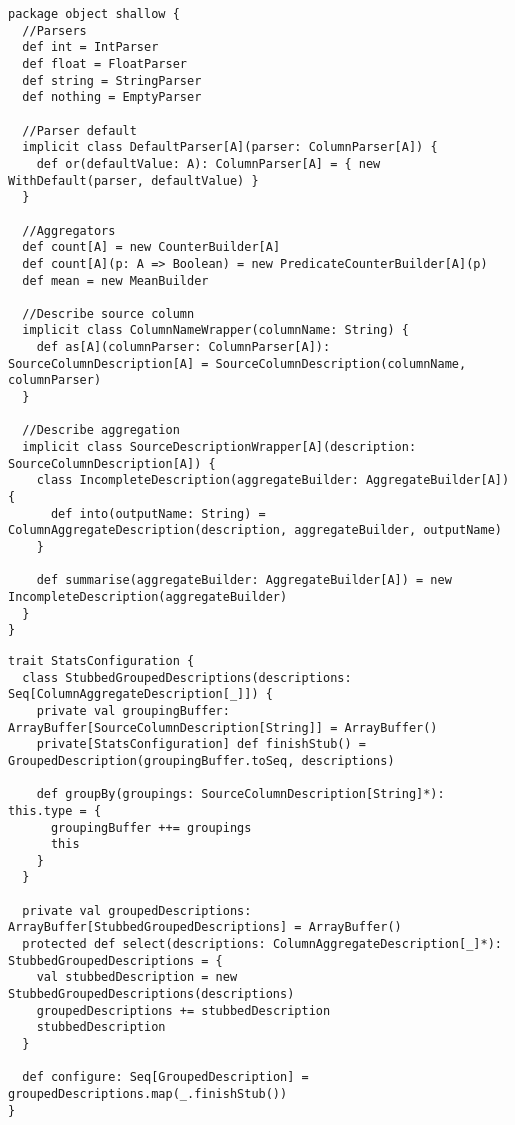\begin{lstlisting}[caption=shallow package object, label=code:shallow]
package object shallow {
  //Parsers
  def int = IntParser
  def float = FloatParser
  def string = StringParser
  def nothing = EmptyParser

  //Parser default
  implicit class DefaultParser[A](parser: ColumnParser[A]) {
    def or(defaultValue: A): ColumnParser[A] = { new WithDefault(parser, defaultValue) }
  }

  //Aggregators
  def count[A] = new CounterBuilder[A]
  def count[A](p: A => Boolean) = new PredicateCounterBuilder[A](p)
  def mean = new MeanBuilder

  //Describe source column
  implicit class ColumnNameWrapper(columnName: String) {
    def as[A](columnParser: ColumnParser[A]): SourceColumnDescription[A] = SourceColumnDescription(columnName, columnParser)
  }

  //Describe aggregation
  implicit class SourceDescriptionWrapper[A](description: SourceColumnDescription[A]) {
    class IncompleteDescription(aggregateBuilder: AggregateBuilder[A]) {
      def into(outputName: String) = ColumnAggregateDescription(description, aggregateBuilder, outputName)
    }

    def summarise(aggregateBuilder: AggregateBuilder[A]) = new IncompleteDescription(aggregateBuilder)
  }
}
\end{lstlisting}

\begin{lstlisting}[caption=StatsConfiguration, label=code:config]
trait StatsConfiguration {
  class StubbedGroupedDescriptions(descriptions: Seq[ColumnAggregateDescription[_]]) {
    private val groupingBuffer: ArrayBuffer[SourceColumnDescription[String]] = ArrayBuffer()
    private[StatsConfiguration] def finishStub() = GroupedDescription(groupingBuffer.toSeq, descriptions)

    def groupBy(groupings: SourceColumnDescription[String]*): this.type = {
      groupingBuffer ++= groupings
      this
    }
  }

  private val groupedDescriptions: ArrayBuffer[StubbedGroupedDescriptions] = ArrayBuffer()
  protected def select(descriptions: ColumnAggregateDescription[_]*): StubbedGroupedDescriptions = {
    val stubbedDescription = new StubbedGroupedDescriptions(descriptions)
    groupedDescriptions += stubbedDescription
    stubbedDescription
  }

  def configure: Seq[GroupedDescription] = groupedDescriptions.map(_.finishStub())
}
\end{lstlisting}

